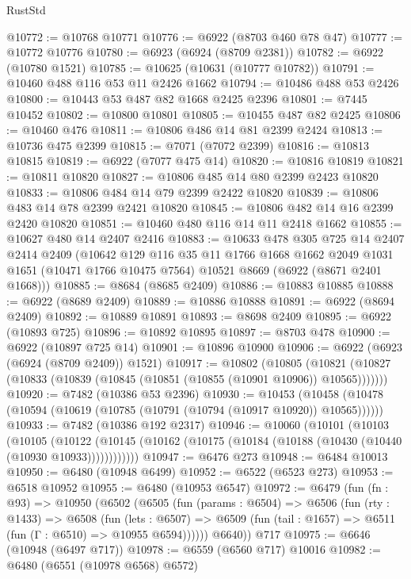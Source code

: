 \begin{lexlean}{RustStd}
\begin{coremodule}
@10772 := @10768 @10771
@10776 := @6922 (@8703 @460 @78 @47)
@10777 := @10772 @10776
@10780 := @6923 (@6924 (@8709 @2381))
@10782 := @6922 (@10780 @1521)
@10785 := @10625 (@10631 (@10777 @10782))
@10791 := @10460 @488 @116 @53 @11 @2426 @1662
@10794 := @10486 @488 @53 @2426
@10800 := @10443 @53 @487 @82 @1668 @2425 @2396
@10801 := @7445 @10452
@10802 := @10800 @10801
@10805 := @10455 @487 @82 @2425
@10806 := @10460 @476
@10811 := @10806 @486 @14 @81 @2399 @2424
@10813 := @10736 @475 @2399
@10815 := @7071 (@7072 @2399)
@10816 := @10813 @10815
@10819 := @6922 (@7077 @475 @14)
@10820 := @10816 @10819
@10821 := @10811 @10820
@10827 := @10806 @485 @14 @80 @2399 @2423 @10820
@10833 := @10806 @484 @14 @79 @2399 @2422 @10820
@10839 := @10806 @483 @14 @78 @2399 @2421 @10820
@10845 := @10806 @482 @14 @16 @2399 @2420 @10820
@10851 := @10460 @480 @116 @14 @11 @2418 @1662
@10855 := @10627 @480 @14 @2407 @2416
@10883 := @10633
    @478
    @305
    @725
    @14
    @2407
    @2414
    @2409
    (@10642
      @129
      @116
      @35
      @11
      @1766
      @1668
      @1662
      @2049
      @1031
      @1651
      (@10471 @1766 @10475 @7564)
      @10521
      @8669
      (@6922 (@8671 @2401 @1668)))
@10885 := @8684 (@8685 @2409)
@10886 := @10883 @10885
@10888 := @6922 (@8689 @2409)
@10889 := @10886 @10888
@10891 := @6922 (@8694 @2409)
@10892 := @10889 @10891
@10893 := @8698 @2409
@10895 := @6922 (@10893 @725)
@10896 := @10892 @10895
@10897 := @8703 @478
@10900 := @6922 (@10897 @725 @14)
@10901 := @10896 @10900
@10906 := @6922 (@6923 (@6924 (@8709 @2409)) @1521)
@10917 := @10802
    (@10805 (@10821 (@10827 (@10833 (@10839 (@10845 (@10851 (@10855 (@10901 @10906)) @10565)))))))
@10920 := @7482 (@10386 @53 @2396)
@10930 := @10453
    (@10458 (@10478 (@10594 (@10619 (@10785 (@10791 (@10794 (@10917 @10920)) @10565))))))
@10933 := @7482 (@10386 @192 @2317)
@10946 := @10060
    (@10101
      (@10103
        (@10105
          (@10122 (@10145 (@10162 (@10175 (@10184 (@10188 (@10430 (@10440 (@10930 @10933))))))))))))
@10947 := @6476 @273
@10948 := @6484 @10013
@10950 := @6480 (@10948 @6499)
@10952 := @6522 (@6523 @273)
@10953 := @6518 @10952
@10955 := @6480 (@10953 @6547)
@10972 := @6479
    (fun (fn : @93) =>
    @10950
      (@6502
        (@6505
          (fun (params : @6504) =>
          @6506
            (fun (rty : @1433) =>
            @6508
              (fun (lets : @6507) =>
              @6509 (fun (tail : @1657) => @6511 (fun (Γ : @6510) => @10955 @6594))))))
        @6640))
    @717
@10975 := @6646 (@10948 (@6497 @717))
@10978 := @6559 (@6560 @717) @10016
@10982 := @6480 (@6551 (@10978 @6568) @6572)

\end{coremodule}
\end{lexlean}
